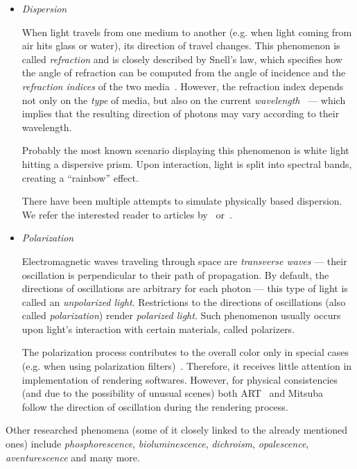 \begin{itemize}
\item \emph{Dispersion}

When light travels from one medium to another (e.g. when light coming from air hits glass or water), its direction of travel changes. This phenomenon is called \emph{refraction} and is closely described by Snell's law, which specifies how the angle of refraction can be computed from the angle of incidence and the \emph{refraction indices} of the two media~\cite{snellsLaw}. However, the refraction index depends not only on the \emph{type} of media, but also on the current \emph{wavelength}~\cite{dispersionRendering1} --- which implies that the resulting direction of photons may vary according to their wavelength.

Probably the most known scenario displaying this phenomenon is white light hitting a dispersive prism. Upon interaction, light is split into spectral bands, creating a ``rainbow'' effect.

There have been multiple attempts to simulate physically based dispersion. We refer the interested reader to articles by~\citet{dispersionRendering1} or~\citet{dispersionRendering2}.

\item \emph{Polarization}

Electromagnetic waves traveling through space are \emph{transverse waves} --- their oscillation is perpendicular to their path of propagation. By default, the directions of oscillations are arbitrary for each photon --- this type of light is called an \emph{unpolarized light}. Restrictions to the directions of oscillations (also called \emph{polarization}) render \emph{polarized light}. Such phenomenon usually occurs upon light's interaction with certain materials, called polarizers.

The polarization process contributes to the overall color only in special cases (e.g. when using polarization filters)~\cite{fluorescencePolarization}. Therefore, it receives little attention in implementation of rendering softwares. However, for physical consistencies (and due to the possibility of unusual scenes) both ART~\cite{ART} and Mitsuba~\cite{Mitsuba2} follow the direction of oscillation during the rendering process.
\end{itemize}

Other researched phenomena (some of it closely linked to the already mentioned ones) include \emph{phosphorescence}, \emph{bioluminescence}, \emph{dichroism}, \emph{opalescence}, \emph{aventurescence} and many more.

